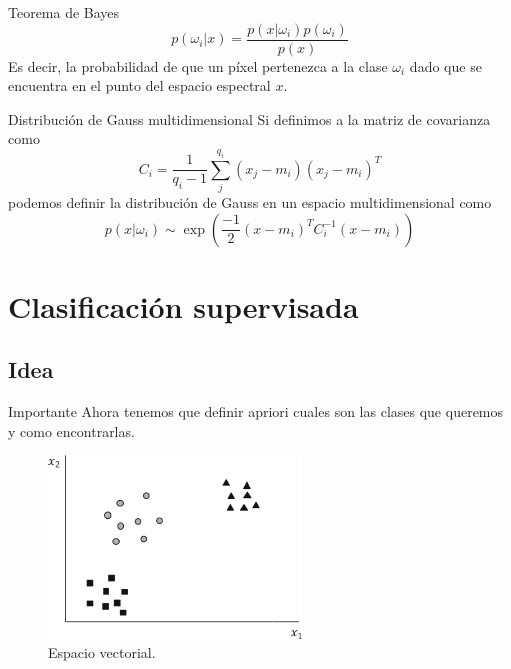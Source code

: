 \documentclass[]{beamer}
\begin{document}
\begin{frame}{\subsecname}
  \begin{block}{Teorema de Bayes}
    $$p(\omega_i|x) = \frac{p(x|\omega_i) p(\omega_i)}{p(x)}$$
    Es decir, la probabilidad de que un píxel pertenezca a la clase $\omega_i$ dado que se encuentra en el punto del espacio espectral $x$.
  \end{block}
\end{frame}

\begin{frame}{\subsecname}
  \begin{block}{Distribución de Gauss multidimensional}
    Si definimos a la matriz de covarianza como $$C_i = \frac{1}{q_i-1} \sum_j^{q_i} (x_j-m_i)(x_j-m_i)^T$$ podemos definir la distribución de Gauss en un espacio multidimensional como $$p(x|\omega_i) \sim \exp (\frac{-1}{2} (x-m_i)^T C_i^{-1} (x-m_i) )$$
  \end{block}
\end{frame}

\section{Clasificación supervisada}
\subsection{Idea}
\begin{frame}{\subsecname}
  \begin{alertblock}{Importante}
    Ahora tenemos que definir apriori cuales son las clases que queremos y como encontrarlas.
  \end{alertblock}
\end{frame}

\begin{frame}{\subsecname}
  \begin{figure}
  \includegraphics[width=0.6\textwidth]{imagenes/vector-3.png}
  \caption{Espacio vectorial.}
  \end{figure}
\end{frame}
\end{document}
